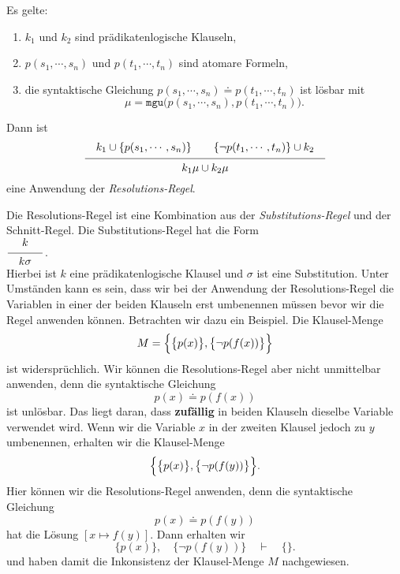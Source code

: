 \begin{Definition} 
    Es gelte:
    \begin{enumerate}
    \item $k_1$ und $k_2$ sind pr\"{a}dikatenlogische Klauseln,
    \item $p(s_1,\cdots,s_n)$ und $p(t_1,\cdots,t_n)$ sind atomare Formeln,
    \item die syntaktische Gleichung $p(s_1,\cdots,s_n)  \doteq p(t_1,\cdots,t_n)$ ist l\"{o}sbar mit 
          \[ \mu = \mathtt{mgu}\bigl(p(s_1,\cdots,s_n), p(t_1,\cdots,t_n)\bigr). \]
    \end{enumerate}
     Dann ist 
     \[ \schluss{k_1 \cup\{ p(s_1,\cdots,s_n)\} \quad\quad \{\neg p(t_1,\cdots,t_n)\} \cup k_2}{
                 k_1\mu \cup k_2\mu} 
     \]
     eine Anwendung der {\emph{\color{blue}Resolutions-Regel}}.
     \eox
\end{Definition}
Die Resolutions-Regel ist eine Kombination aus der {\emph{\color{blue}Substitutions-Regel}} und der 
Schnitt-Regel.  Die Substitutions-Regel hat die Form
\\[0.2cm]
\hspace*{1.3cm}
$\schluss{k}{k\sigma}$. 
\\[0.2cm]
Hierbei ist $k$ eine pr\"{a}dikatenlogische Klausel und $\sigma$ ist eine Substitution.
Unter Umst\"{a}nden kann es sein, dass wir bei der Anwendung der Resolutions-Regel 
die Variablen in einer der beiden Klauseln erst umbenennen
m\"{u}ssen bevor wir die Regel anwenden k\"{o}nnen.  Betrachten wir dazu ein Beispiel.
Die Klausel-Menge 
\[ M = \Bigl\{ \bigl\{ p(x) \bigr\}, \bigl\{ \neg p(f(x)) \bigr\} \Bigr\} \]
ist widerspr\"{u}chlich.  Wir k\"{o}nnen die Resolutions-Regel aber nicht unmittelbar anwenden,
denn die syntaktische Gleichung 
\[ p(x) \doteq p(f(x)) \]
ist unl\"{o}sbar.  Das liegt daran, dass \textbf{zuf\"{a}llig} in beiden Klauseln dieselbe Variable
verwendet wird.  Wenn wir die Variable $x$ in der zweiten Klausel jedoch zu $y$ umbenennen, erhalten
wir die Klausel-Menge 
\[ \Bigl\{ \bigl\{ p(x) \bigr\}, \bigl\{ \neg p(f(y)) \bigr\} \Bigr\}. \]
Hier k\"{o}nnen wir die Resolutions-Regel anwenden, denn die syntaktische Gleichung 
\[ p(x) \doteq p(f(y)) \]
hat die L\"{o}sung $[x \mapsto f(y)]$.  Dann erhalten wir 
\[ \bigl\{ p(x) \bigr\}, \quad \bigl\{ \neg p(f(y)) \bigr\} \quad \vdash \quad \{\}. \]
und haben damit die Inkonsistenz der Klausel-Menge $M$ nachgewiesen.

